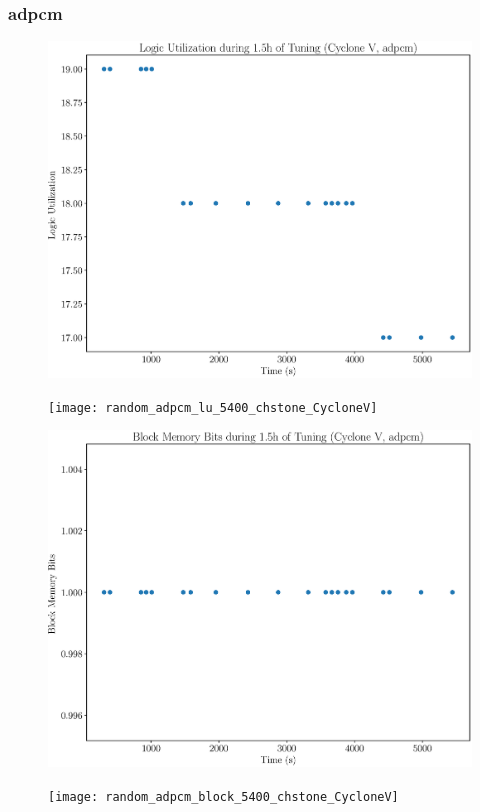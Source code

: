 \documentclass[12pt, a4paper]{article}
\begin{document}
\newpage

\subsubsection{adpcm}

\begin{figure}[htpb]
    \centering
    \noindent
    \begin{minipage}{.48\textwidth}
        \centering
        \includegraphics[scale=.25]{adpcm_lu_5400_chstone_CycloneV}
    \end{minipage}%
    \hfill
    \begin{minipage}{.48\textwidth}
        \centering
        \texttt{[image: random\_adpcm\_lu\_5400\_chstone\_CycloneV]}
    \end{minipage}%

    \begin{minipage}{.48\textwidth}
        \includegraphics[scale=.25]{adpcm_block_5400_chstone_CycloneV}
    \end{minipage}%
    \hfill
    \begin{minipage}{.48\textwidth}
        \texttt{[image: random\_adpcm\_block\_5400\_chstone\_CycloneV]}
    \end{minipage}%


\end{figure}
\end{document}
